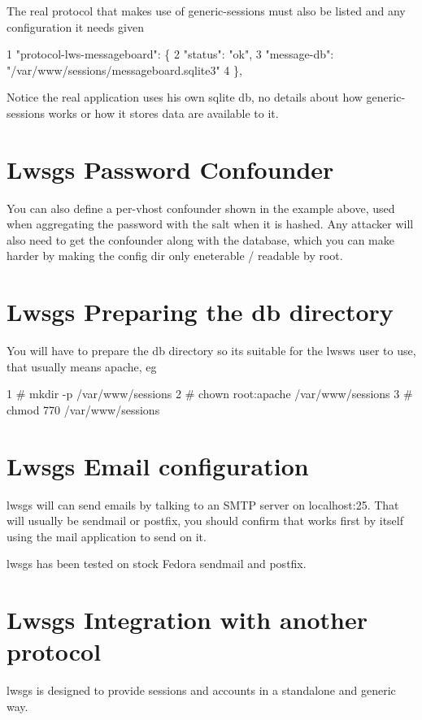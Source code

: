 The real protocol that makes use of generic-\/sessions must also be listed and any configuration it needs given


\begin{DoxyCode}
1 "protocol-lws-messageboard": \{
2   "status": "ok",
3   "message-db": "/var/www/sessions/messageboard.sqlite3"
4 \},
\end{DoxyCode}


Notice the real application uses his own sqlite db, no details about how generic-\/sessions works or how it stores data are available to it.\hypertarget{md_README.generic-sessions_gspwc}{}\section{Lwsgs Password Confounder}\label{md_README.generic-sessions_gspwc}
You can also define a per-\/vhost confounder shown in the example above, used when aggregating the password with the salt when it is hashed. Any attacker will also need to get the confounder along with the database, which you can make harder by making the config dir only eneterable / readable by root.\hypertarget{md_README.generic-sessions_gsprep}{}\section{Lwsgs Preparing the db directory}\label{md_README.generic-sessions_gsprep}
You will have to prepare the db directory so it\textquotesingle{}s suitable for the lwsws user to use, that usually means apache, eg


\begin{DoxyCode}
1 # mkdir -p /var/www/sessions
2 # chown root:apache /var/www/sessions
3 # chmod 770 /var/www/sessions
\end{DoxyCode}
\hypertarget{md_README.generic-sessions_gsrmail}{}\section{Lwsgs Email configuration}\label{md_README.generic-sessions_gsrmail}
lwsgs will can send emails by talking to an S\+M\+TP server on localhost\+:25. That will usually be sendmail or postfix, you should confirm that works first by itself using the {\ttfamily mail} application to send on it.

lwsgs has been tested on stock Fedora sendmail and postfix.\hypertarget{md_README.generic-sessions_gsap}{}\section{Lwsgs Integration with another protocol}\label{md_README.generic-sessions_gsap}
lwsgs is designed to provide sessions and accounts in a standalone and generic way.


